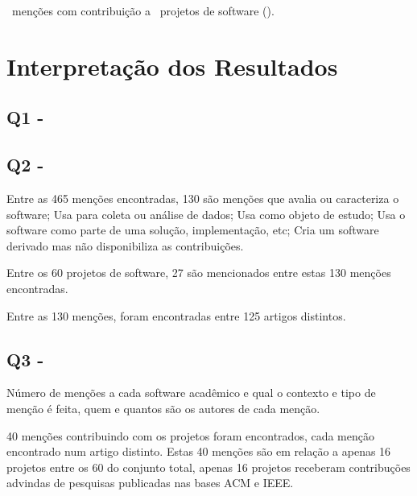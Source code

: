 
\ContributeStudyDoisCount \ menções com contribuição a
\ContributeStudyDoisSoftware \ projetos de software
().


\section{Interpretação dos Resultados} \label{estudo2:interpretacao} %

\subsection{Q1 - \EstudoDoisQuestaoUm}


\subsection{Q2 - \EstudoDoisQuestaoDois}

Entre as 465 menções encontradas, 130 são menções que avalia ou caracteriza o
software; Usa para coleta ou análise de dados; Usa como objeto de estudo; Usa o
software como parte de uma solução, implementação, etc; Cria um software
derivado mas não disponibiliza as contribuições.

Entre os 60 projetos de software, 27 são mencionados entre estas 130 menções
encontradas.


Entre as 130 menções, foram encontradas entre 125 artigos distintos.

\subsection{Q3 - \EstudoDoisQuestaoTres}

Número de menções a cada software acadêmico e qual o contexto e tipo de menção
é feita, quem e quantos são os autores de cada menção.


40 menções contribuindo com os projetos foram encontrados, cada menção
encontrado num artigo distinto. Estas 40 menções são em relação a apenas
16 projetos entre os 60 do conjunto total, apenas 16 projetos receberam
contribuções advindas de pesquisas publicadas nas bases ACM e IEEE.


